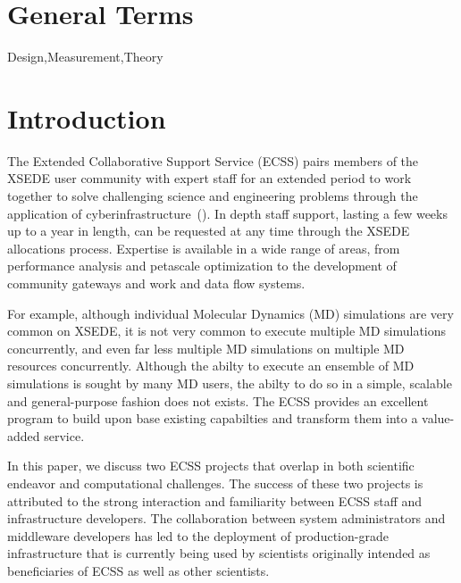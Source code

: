 \documentclass{sig-alternate}
\begin{document}

\section*{General Terms}{Design,Measurement,Theory}

 \keywords{}

\section{Introduction}



The Extended Collaborative Support Service (ECSS) pairs members of the XSEDE
user community with expert staff for an extended period to work together to
solve challenging science and engineering problems through the application of
cyberinfrastructure~(\cite{ECSS_webpage}). In depth staff support, lasting a few
weeks up to a year in length, can be requested at any time through the XSEDE
allocations process. Expertise is available in a wide range of areas, from
performance analysis and petascale optimization to the development of community
gateways and work and data flow systems.

For example, although individual Molecular Dynamics (MD) simulations
are very common on XSEDE, it is not very common to execute multiple MD
simulations concurrently, and even far less multiple MD simulations on
multiple MD resources concurrently. Although the abilty to execute an
ensemble of MD simulations is sought by many MD users, the abilty to
do so in a simple, scalable and general-purpose fashion does not
exists.  The ECSS provides an excellent program to build upon base
existing capabilties and transform them into a value-added service.

In this paper, we discuss two ECSS projects that overlap in both
scientific endeavor and computational challenges. The success of these
two projects is attributed to the strong interaction and familiarity
between ECSS staff and infrastructure developers. The collaboration
between system administrators and middleware developers has led to the
deployment of production-grade infrastructure that is currently being
used by scientists originally intended as beneficiaries of ECSS as well
as other scientists.
\end{document}
